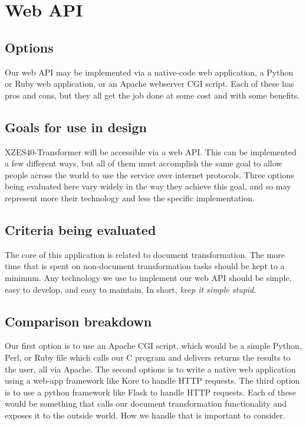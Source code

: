 \section{Web API}

\subsection{Options}

Our web API may be implemented via a native-code web application, a Python or Ruby web application, or an Apache webserver CGI script.
Each of these has pros and cons, but they all get the job done at some cost and with some benefits.

\subsection{Goals for use in design}

XZES40-Transformer will be accessible via a web API.
This can be implemented a few different ways, but all of them must accomplish the same goal to allow people across the world to use the service over internet protocols.
Three options being evaluated here vary widely in the way they achieve this goal, and so may represent more their technology and less the specific implementation.

\subsection{Criteria being evaluated}

The core of this application is related to document transformation.
The more time that is spent on non-document transformation tasks should be kept to a minimum.
Any technology we use to implement our web API should be simple, easy to develop, and easy to maintain.
In short, \textit{keep it simple stupid}.

\subsection{Comparison breakdown}

Our first option is to use an Apache CGI script, which would be a simple Python, Perl, or Ruby file which calls our C program and delivers returns the results to the user, all via Apache.
The second options is to write a native web application using a web-app framework like Kore to handle HTTP requests.
The third option is to use a python framework like Flask to handle HTTP requests.
Each of these would be something that calls our document transformation functionality and exposes it to the outside world.
How we handle that is important to consider.

